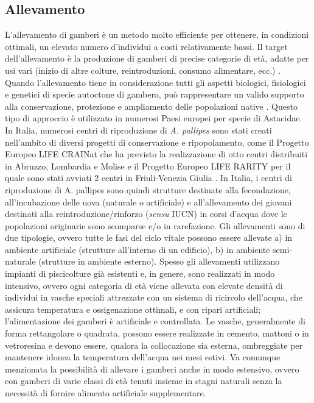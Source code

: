 \documentclass[11pt,a4paper,italian,twoside,openany]{memoir}
\begin{document}
\subsection{Allevamento}
L'allevamento di gamberi è un metodo molto efficiente per ottenere, in condizioni ottimali, un elevato numero d'individui a costi relativamente bassi. Il target dell'allevamento è la produzione di gamberi di precise categorie di età, adatte per usi vari (inizio di altre colture, reintroduzioni, consumo alimentare, ecc.) \cite{Keller 1988}. Quando l'allevamento tiene in considerazione tutti gli aspetti biologici, fisiologici e genetici di specie autoctone di gambero, può rappresentare un valido supporto alla conservazione, protezione e ampliamento delle popolazioni native \cite{Policar 2015}. Questo tipo di approccio è utilizzato in numerosi Paesi europei per specie di Astacidae. In Italia, numerosi centri di riproduzione di \emph{A. pallipes} sono stati creati nell'ambito di diversi progetti di conservazione e ripopolamento, come il Progetto Europeo LIFE CRAINat che ha previsto la realizzazione di otto centri distribuiti in Abruzzo, Lombardia e Molise \cite{AA.VV. 2014} e il Progetto Europeo LIFE RARITY per il quale sono stati avviati 2 centri in Friuli-Venezia Giulia \cite{RARITY}. In Italia, i centri di riproduzione di A. pallipes sono quindi strutture destinate alla fecondazione, all'incubazione delle uova (naturale o artificiale) e all'allevamento dei giovani destinati alla reintroduzione/rinforzo (\emph{sensu} IUCN) in corsi d'acqua dove le popolazioni originarie sono scomparse e/o in rarefazione. Gli allevamenti sono di due tipologie, ovvero tutte le fasi del ciclo vitale possono essere allevate a) in ambiente artificiale (strutture all'interno di un edificio), b) in ambiente semi-naturale (strutture in ambiente esterno). Spesso gli allevamenti utilizzano impianti di piscicolture già esistenti e, in genere, sono realizzati in modo intensivo, ovvero ogni categoria di età viene allevata con elevate densità di individui in vasche speciali attrezzate con un sistema di ricircolo dell'acqua, che assicura temperatura e ossigenazione ottimali, e con ripari artificiali; l'alimentazione dei gamberi è artificiale e controllata. Le vasche, generalmente di forma rettangolare o quadrata, possono essere realizzate in cemento, mattoni o in vetroresina e devono essere, qualora la collocazione sia esterna, ombreggiate per mantenere idonea la temperatura dell'acqua nei mesi estivi. Va comunque menzionata la possibilità di allevare i gamberi anche in modo estensivo, ovvero con gamberi di varie classi di età tenuti insieme in stagni naturali senza la necessità di fornire alimento artificiale supplementare.
\end{document}
